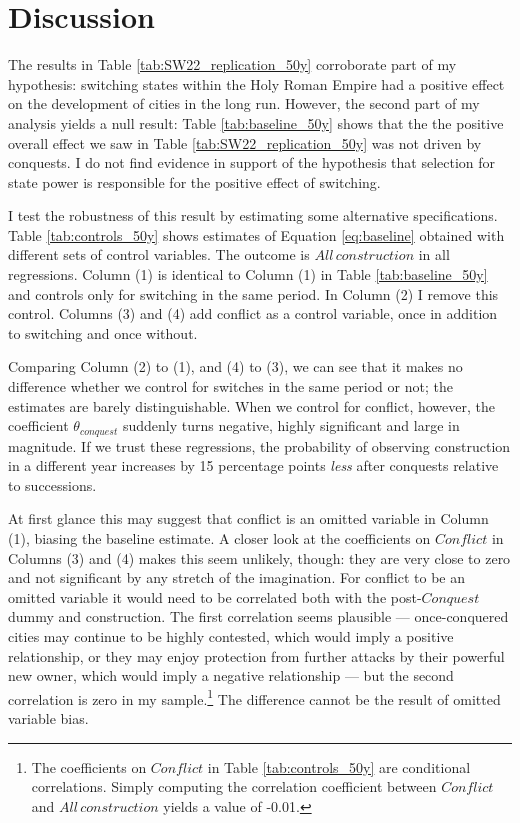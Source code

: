 \documentclass[11pt, a4paper]{article}
\begin{document}

\section{Discussion} \label{sec:discussion}

The results in Table \ref{tab:SW22_replication_50y} corroborate part of my hypothesis: switching states within the Holy Roman Empire had a positive effect on the development of cities in the long run. However, the second part of my analysis yields a null result: Table \ref{tab:baseline_50y} shows that the the positive overall effect we saw in Table \ref{tab:SW22_replication_50y} was not driven by conquests. I do not find evidence in support of the hypothesis that selection for state power is responsible for the positive effect of switching.

I test the robustness of this result by estimating some alternative specifications. Table \ref{tab:controls_50y} shows estimates of Equation \eqref{eq:baseline} obtained with different sets of control variables. The outcome is $All \, construction$ in all regressions. Column (1) is identical to Column (1) in Table \ref{tab:baseline_50y} and controls only for switching in the same period. In Column (2) I remove this control. Columns (3) and (4) add conflict as a control variable, once in addition to switching and once without.

Comparing Column (2) to (1), and (4) to (3), we can see that it makes no difference whether we control for switches in the same period or not; the estimates are barely distinguishable. When we control for conflict, however, the coefficient $\theta_{conquest}$ suddenly turns negative, highly significant and large in magnitude. If we trust these regressions, the probability of observing construction in a different year increases by 15 percentage points \textit{less} after conquests relative to successions.

At first glance this may suggest that conflict is an omitted variable in Column (1), biasing the baseline estimate. A closer look at the coefficients on $Conflict$ in Columns (3) and (4) makes this seem unlikely, though: they are very close to zero and not significant by any stretch of the imagination. For conflict to be an omitted variable it would need to be correlated both with the post-$Conquest$ dummy and construction. The first correlation seems plausible --- once-conquered cities may continue to be highly contested, which would imply a positive relationship, or they may enjoy protection from further attacks by their powerful new owner, which would imply a negative relationship --- but the second correlation is zero in my sample.\footnote
{
The coefficients on $Conflict$ in Table \ref{tab:controls_50y} are conditional correlations. Simply computing the correlation coefficient between $Conflict$ and $All\,construction$ yields a value of -0.01.
} The difference cannot be the result of omitted variable bias.
\end{document}
